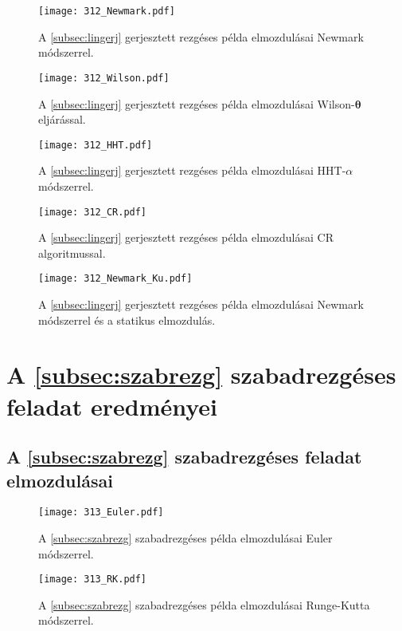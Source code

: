 \begin{figure}[H]
\centering
\texttt{[image: 312\_Newmark.pdf]}
\caption{A \ref{subsec:lingerj} gerjesztett rezgéses példa elmozdulásai Newmark módszerrel.}
\label{fig:függlingerjeredm_newmark}
\end{figure}
\begin{figure}[H]
\centering
\texttt{[image: 312\_Wilson.pdf]}
\caption{A \ref{subsec:lingerj} gerjesztett rezgéses példa elmozdulásai Wilson-$\boldsymbol\theta$ eljárással.}
\label{fig:függlingerjeredm_wilson}
\end{figure}
\begin{figure}[H]
\centering
\texttt{[image: 312\_HHT.pdf]}
\caption{A \ref{subsec:lingerj} gerjesztett rezgéses példa elmozdulásai HHT-$\alpha$ módszerrel.}
\label{fig:függlingerjeredm_hht}
\end{figure}
\begin{figure}[H]
\centering
\texttt{[image: 312\_CR.pdf]}
\caption{A \ref{subsec:lingerj} gerjesztett rezgéses példa elmozdulásai CR algoritmussal.}
\label{fig:függlingerjeredm_cr}
\end{figure}

\begin{figure}[H]
\centering
\texttt{[image: 312\_Newmark\_Ku.pdf]}
\caption{A \ref{subsec:lingerj} gerjesztett rezgéses példa elmozdulásai Newmark módszerrel és a statikus elmozdulás.}
\label{fig:függlingerjeredm_newmark_Ku}
\end{figure}


\section{A \ref{subsec:szabrezg} szabadrezgéses feladat eredményei}\label{sec:függ_szabrezg}

\subsection{A \ref{subsec:szabrezg} szabadrezgéses feladat elmozdulásai}\label{sec:függ_szabrezg_elm}

\begin{figure}[H]
\centering
\texttt{[image: 313\_Euler.pdf]}
\caption{A \ref{subsec:szabrezg} szabadrezgéses példa elmozdulásai Euler módszerrel.}
\label{fig:függszabrezg_er_euler}
\end{figure}

\begin{figure}[H]
\centering
\texttt{[image: 313\_RK.pdf]}
\caption{A \ref{subsec:szabrezg} szabadrezgéses példa elmozdulásai Runge-Kutta módszerrel.}
\label{fig:függszabrezg_er_rk}
\end{figure}


